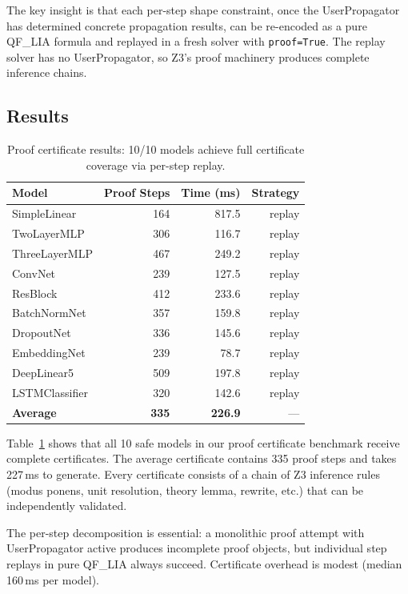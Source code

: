 \documentclass[11pt]{article}
\begin{document}
The key insight is that each per-step shape constraint, once
the UserPropagator has determined concrete propagation results,
can be re-encoded as a pure QF\_LIA formula and replayed in
a fresh solver with \texttt{proof=True}.  The replay solver
has no UserPropagator, so Z3's proof machinery produces
complete inference chains.

\subsection{Results}

\begin{table}[t]
\centering
\caption{Proof certificate results: 10/10 models achieve
  full certificate coverage via per-step replay.}
\label{tab:proof-certs}
\small
\begin{tabular}{@{}lrrr@{}}
\toprule
\textbf{Model} & \textbf{Proof Steps} &
  \textbf{Time (ms)} & \textbf{Strategy} \\
\midrule
SimpleLinear     & 164 &  817.5 & replay \\
TwoLayerMLP      & 306 &  116.7 & replay \\
ThreeLayerMLP    & 467 &  249.2 & replay \\
ConvNet          & 239 &  127.5 & replay \\
ResBlock         & 412 &  233.6 & replay \\
BatchNormNet     & 357 &  159.8 & replay \\
DropoutNet       & 336 &  145.6 & replay \\
EmbeddingNet     & 239 &   78.7 & replay \\
DeepLinear5      & 509 &  197.8 & replay \\
LSTMClassifier   & 320 &  142.6 & replay \\
\midrule
\textbf{Average} & \textbf{335} & \textbf{226.9} & --- \\
\bottomrule
\end{tabular}
\end{table}

Table~\ref{tab:proof-certs} shows that all 10 safe models
in our proof certificate benchmark receive complete certificates.
The average certificate contains 335 proof steps and takes 227\,ms
to generate.  Every certificate consists of a chain of Z3 inference
rules (modus ponens, unit resolution, theory lemma, rewrite, etc.)
that can be independently validated.

The per-step decomposition is essential: a monolithic proof
attempt with UserPropagator active produces incomplete proof
objects, but individual step replays in pure QF\_LIA always
succeed.  Certificate overhead is modest (median 160\,ms per model).
\end{document}

